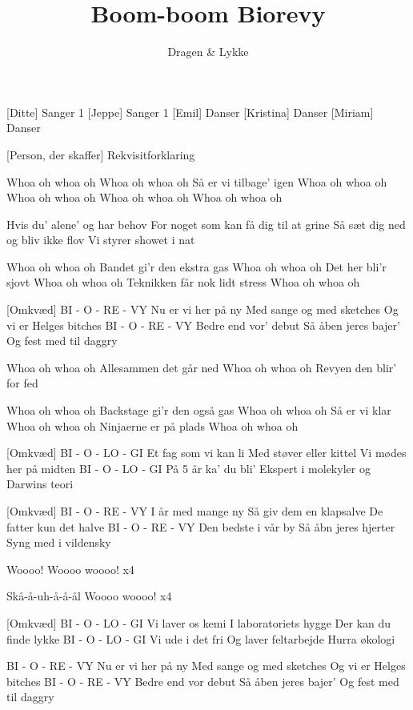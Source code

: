 \documentclass[a4paper,11pt]{article}
\title{Boom-boom Biorevy}
\author{Dragen \& Lykke}
\begin{document}
\maketitle

\begin{roles}
    [Ditte] Sanger 1
    [Jeppe] Sanger 1
    [Emil] Danser
    [Kristina] Danser
    [Miriam] Danser
\end{roles}

\begin{props}
    [Person, der skaffer] Rekvisitforklaring
\end{props}

\begin{song}

Whoa oh whoa oh
Whoa oh whoa oh
Så er vi tilbage’ igen
Whoa oh whoa oh
Whoa oh whoa oh
Whoa oh whoa oh
Whoa oh whoa oh

Hvis du’ alene’ og har behov
For noget som kan få dig til at grine
Så sæt dig ned og bliv 
ikke flov
Vi styrer showet i nat 

Whoa oh whoa oh
Bandet gi’r den ekstra gas
Whoa oh whoa oh
Det her bli’r sjovt
Whoa oh whoa oh
Teknikken får nok lidt stress
Whoa oh whoa oh

\sings{}[Omkvæd]
BI - O - RE - VY
Nu er vi her på ny
Med sange og med sketches
Og vi er Helges bitches
BI - O - RE - VY
Bedre end vor’ debut
Så åben jeres bajer’
Og fest med til daggry

Whoa oh whoa oh
Allesammen det går ned
Whoa oh whoa oh
Revyen den blir’ for fed

Whoa oh whoa oh
Backstage gi'r den også gas
Whoa oh whoa oh
Så er vi klar
Whoa oh whoa oh
Ninjaerne er på plads
Whoa oh whoa oh

\sings{}[Omkvæd]
BI - O - LO - GI
Et fag som vi kan li
Med støver eller kittel
Vi mødes her på midten
BI - O - LO - GI
På 5 år ka’ du bli’
Ekspert i molekyler 
og Darwins teori

\sings{}[Omkvæd]
BI - O - RE - VY
I år med mange ny
Så giv dem en klapsalve
De fatter kun det halve
BI - O - RE - VY
Den bedste i vår by
Så åbn jeres hjerter
Syng med i vildensky

Woooo!
Woooo woooo!
\scene x4

Skå-å-uh-å-å-ål
Woooo woooo!
\scene x4

\sings{}[Omkvæd]
BI - O - LO - GI
Vi laver os kemi
I laboratoriets hygge
Der kan du finde lykke
BI - O - LO - GI
Vi ude i det fri 
Og laver feltarbejde
Hurra økologi

BI - O - RE - VY
Nu er vi her på ny
Med sange og med sketches
Og vi er Helges bitches
BI - O - RE - VY
Bedre end vor debut
Så åben jeres bajer’
Og fest med til daggry

\end{song}
\end{document}
